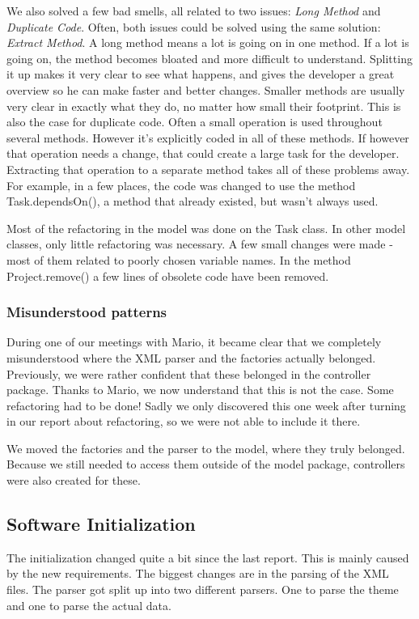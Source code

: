 				We also solved a few bad smells, all related to two issues: \emph{Long Method} and
				\emph{Duplicate Code}. Often, both issues could be solved using the
				same solution: \emph{Extract Method}.
				A long method means a lot is going on in one method. If a lot is going on, the
				method becomes bloated and more difficult to understand.
				Splitting it up makes it very clear to see what happens, and gives the
				developer a great overview so he can make faster and better changes.
				Smaller methods are usually very clear in exactly what they do, no matter how
				small their footprint.
				This is also the case for duplicate code. Often a small operation is used
				throughout several methods. However it's explicitly coded in all of these
				methods.
				If however that operation needs a change, that could create a large task for the
				developer.
				Extracting that operation to a separate method takes all of these problems away.
				For example, in a few places, the code was changed to use the method Task.dependsOn(), a method that already existed, but wasn't always used.
				
				Most of the refactoring in the model was done on the Task class. In other model classes, only little refactoring was necessary. A few small changes were made - most of them related to poorly chosen variable names. 
				In the method Project.remove() a few lines of obsolete code have been removed.


			\subsubsection{Misunderstood patterns}
			During one of our meetings with Mario, it became clear that we completely misunderstood where the XML parser and the factories actually belonged. Previously, we were rather confident that these belonged in the controller package. Thanks to Mario, we now understand that this is not the case. Some refactoring had to be done! Sadly we only discovered this one week after turning in our report about refactoring, so we were not able to include it there.
			
			We moved the factories and the parser to the model, where they truly belonged. Because we still needed to access them outside of the model package, controllers were also created for these.
		\subsection{Software Initialization}
			The initialization changed quite a bit since the last report. This is mainly caused by the new requirements. The biggest changes are in the parsing of the XML files. The parser got split up into two different parsers. One to parse the theme and one to parse the actual data.
			
